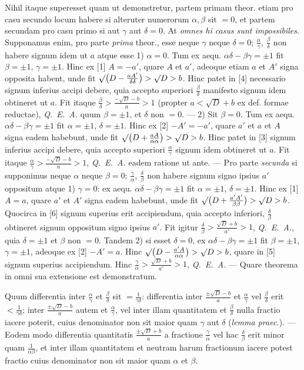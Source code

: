 Nihil itaque superesset quam ut demonstretur, partem primam theor. etiam pro casu secundo locum habere si alteruter numerorum $\alpha,\beta$ sit $=0$, et partem secundam pro casu primo si aut $\gamma$ aut $\delta=0$. At \textit{omnes hi casus sunt impossibiles}. Supponamus enim, pro parte \textit{prima} theor., esse neque $\gamma$ neque $\delta=0$; $\frac{\alpha}{\gamma}$, $\frac{\beta}{\delta}$ non habere signum idem ut $a$ atque esse 1) $\alpha=0$. Tum ex aequ. $\alpha\delta-\beta\gamma=\pm1$ fit $\beta=\pm1$, $\gamma=\pm1$. Hinc ex [1] $A=-a'$, quare $A$ et $a'$, adeoque etiam $a$ et $A'$ signa opposita habent, unde fit $\surd\bigl(D-\frac{aA'}{\delta\delta}\bigr)>\surd D>b$. Hinc patet in [4] necessario signum inferius accipi debere, quia accepto superiori $\frac{\beta}{\delta}$ manifesto signum idem obtineret ut $a$. Fit itaque $\frac{\beta}{\delta}>\frac{-\surd D-b}{a}>1$ (propter $a<\surd D+b$ ex def. formae reductae), \textit{Q. E. A.} quum $\beta=\pm1$, et $\delta$ non $=0$. --- 2) Sit $\beta=0$. Tum ex aequ. $\alpha\delta-\beta\gamma=\pm1$ fit $\alpha=\pm1$, $\delta=\pm1$. Hinc ex [2] $-A'=-a'$, quare $a'$ et $a$ et $A$ signa eadem habebunt, unde fit ${\surd\bigl(D+\frac{aA}{\alpha\alpha}\bigr)}>\surd D>b$. Hinc patet in [3] signum inferius accipi debere, quia accepto superiori $\frac{\alpha}{\gamma}$ signum idem obtineret ut $a$. Fit itaque $\frac{\alpha}{\gamma}>\frac{-\surd D-b}{a}>1$, \textit{Q. E. A.} eadem ratione ut ante. --- Pro parte \textit{secunda} si supponimus neque $\alpha$ neque $\beta=0$; $\frac{\gamma}{\alpha}$, $\frac{\delta}{\beta}$ non habere signum signo ipsius $a'$ oppositum atque 1) $\gamma=0$: ex aequ. $\alpha\delta-\beta\gamma=\pm1$ fit $\alpha=\pm1$, $\delta=\pm1$. Hinc ex [1] $A=a$, quare $a'$ et $A'$ signa eadem habebunt, unde fit $\surd\bigl(D+\frac{a'A'}{\beta\beta}\bigr)>\surd D>b$. Quocirca in [6] signum superius erit accipiendum, quia accepto inferiori, $\frac{\delta}{\beta}$ obtineret signum oppositum signo ipsius $a'$. Fit igitur $\frac{\delta}{\beta}>\frac{\surd D+b}{a'}>1$, \textit{Q. E. A.}, quia $\delta=\pm1$ et $\beta$ non $=0$. Tandem 2) si esset $\delta=0$, ex $\alpha\delta-\beta\gamma=\pm1$ fit $\beta=\pm1$, $\gamma=\pm1$, adeoque ex [2] $-A'=a$. Hinc $\surd\bigl(D-\frac{a'A}{\alpha\alpha}\bigr)>\surd D>b$, quare in [5] signum superius accipiendum. Hinc $\frac{\gamma}{\alpha}>\frac{\surd D+b}{a'}>1$, \textit{Q. E. A.} --- Quare theorema in omni sua extensione est demonstratum.

Quum differentia inter $\frac{\alpha}{\gamma}$ et $\frac{\beta}{\delta}$ sit $=\frac{1}{\gamma\delta}$: differentia inter $\frac{\pm\surd D-b}{a}$ et $\frac{\alpha}{\gamma}$ vel $\frac{\beta}{\delta}$ erit $<\frac{1}{\gamma\delta}$; inter $\frac{\pm\surd D-b}{a}$ autem et $\frac{\alpha}{\gamma}$, vel inter illam quantitatem et $\frac{\beta}{\delta}$ nulla fractio iacere poterit, cuius denominator non sit maior quam $\gamma$ aut $\delta$ (\textit{lemma praec.}). --- Eodem modo differentia quantitatis ${\frac{\pm\surd D+b}{a}}$ a fractione $\frac{\gamma}{\alpha}$ vel hac $\frac{\delta}{\beta}$
erit minor quam $\frac{1}{\alpha\beta}$, et inter illam quantitatem et neutram harum fractionum iacere potest fractio cuius denominator non sit maior quam $\alpha$ et $\beta$.

